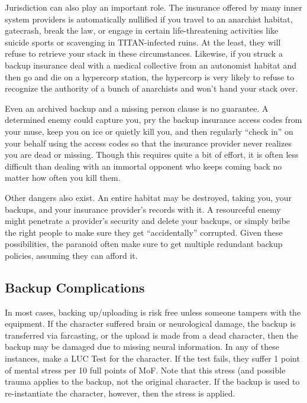 Jurisdiction can also play an important role. The 
insurance offered by many inner system providers is 
automatically nullified if you travel to an anarchist 
habitat, gatecrash, break the law, or engage in certain 
life-threatening activities like suicide sports or scavenging
in TITAN-infected ruins. At the least, they will
refuse to retrieve your stack in these circumstances. 
Likewise, if you struck a backup insurance deal with 
a medical collective from an autonomist habitat and 
then go and die on a hypercorp station, the hypercorp 
is very likely to refuse to recognize the authority of a 
bunch of anarchists and won't hand your stack over.

Even an archived backup and a missing person 
clause is no guarantee. A determined enemy could 
capture you, pry the backup insurance access codes 
from your muse, keep you on ice or quietly kill you, 
and then regularly ``check in'' on your behalf using 
the access codes so that the insurance provider never 
realizes you are dead or missing. Though this requires 
quite a bit of effort, it is often less difficult than dealing
with an immortal opponent who keeps coming
back no matter how often you kill them.

Other dangers also exist. An entire habitat may be 
destroyed, taking you, your backups, and your insurance
provider's records with it. A resourceful enemy
might penetrate a provider's security and delete your 
backups, or simply bribe the right people to make 
sure they get ``accidentally'' corrupted. Given these 
possibilities, the paranoid often make sure to get 
multiple redundant backup policies, assuming they 
can afford it.

\subsection{Backup Complications}

In most cases, backing up/uploading is risk free unless 
someone tampers with the equipment. If the character 
suffered brain or neurological damage, the backup is 
transferred via farcasting, or the upload is made from 
a dead character, then the backup may be damaged 
due to missing neural information. In any of these 
instances, make a LUC Test for the character. If the 
test fails, they suffer 1 point of mental stress per 10 
full points of MoF. Note that this stress (and possible
trauma applies to the backup, not the original
character. If the backup is used to re-instantiate the 
character, however, then the stress is applied.

